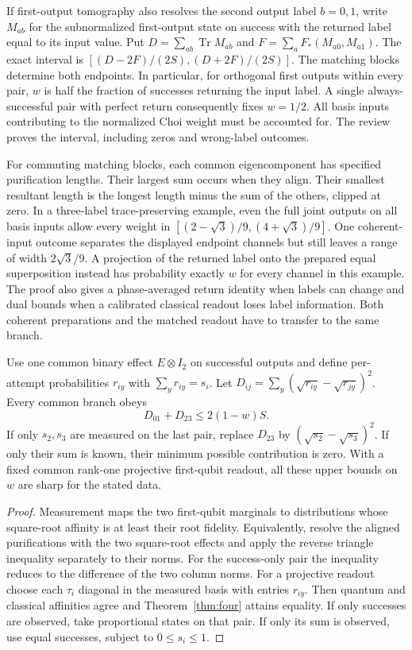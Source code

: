 \documentclass[11pt,letterpaper]{article}
\newcommand{\tr}{\operatorname{Tr}}\newcommand{\TV}{\operatorname{TV}}\newcommand{\E}{\mathbb E}\newcommand{\id}{\mathbb I}\newcommand{\calB}{\mathcal B}\newcommand{\norm}[1]{\left\lVert#1\right\rVert}
\begin{document}
If first-output tomography also resolves the second output label $b=0,1$, write $M_{ab}$ for the subnormalized first-output state on success with the returned label equal to its input value. Put $D=\sum_{ab}\tr M_{ab}$ and $F=\sum_aF_*(M_{a0},M_{a1})$. The exact interval is $[(D-2F)/(2S),(D+2F)/(2S)]$. The matching blocks determine both endpoints. In particular, for orthogonal first outputs within every pair, $w$ is half the fraction of successes returning the input label. A single always-successful pair with perfect return consequently fixes $w=1/2$. All basis inputs contributing to the normalized Choi weight must be accounted for. The review proves the interval, including zeros and wrong-label outcomes.

For commuting matching blocks, each common eigencomponent has specified purification lengths. Their largest sum occurs when they align. Their smallest resultant length is the longest length minus the sum of the others, clipped at zero. In a three-label trace-preserving example, even the full joint outputs on all basis inputs allow every weight in $[(2-\sqrt3)/9,(4+\sqrt3)/9]$. One coherent-input outcome separates the displayed endpoint channels but still leaves a range of width $2\sqrt3/9$. A projection of the returned label onto the prepared equal superposition instead has probability exactly $w$ for every channel in this example. The proof also gives a phase-averaged return identity when labels can change and dual bounds when a calibrated classical readout loses label information. Both coherent preparations and the matched readout have to transfer to the same branch.

\begin{corollary}\label{cor:rows}
Use one common binary effect $E\otimes I_2$ on successful outputs and define per-attempt probabilities $r_{iy}$ with $\sum_y r_{iy}=s_i$. Let $D_{ij}=\sum_y(\sqrt{r_{iy}}-\sqrt{r_{jy}})^2$. Every common branch obeys
\[
 D_{01}+D_{23}\le2(1-w)S .
\]
If only $s_2,s_3$ are measured on the last pair, replace $D_{23}$ by $(\sqrt{s_2}-\sqrt{s_3})^2$. If only their sum is known, their minimum possible contribution is zero. With a fixed common rank-one projective first-qubit readout, all these upper bounds on $w$ are sharp for the stated data.
\end{corollary}
\begin{proof}
Measurement maps the two first-qubit marginals to distributions whose square-root affinity is at least their root fidelity. Equivalently, resolve the aligned purifications with the two square-root effects and apply the reverse triangle inequality separately to their norms. For the success-only pair the inequality reduces to the difference of the two column norms. For a projective readout choose each $\tau_i$ diagonal in the measured basis with entries $r_{iy}$. Then quantum and classical affinities agree and Theorem~\ref{thm:four} attains equality. If only successes are observed, take proportional states on that pair. If only its sum is observed, use equal successes, subject to $0\le s_i\le1$.
\end{proof}
\end{document}
